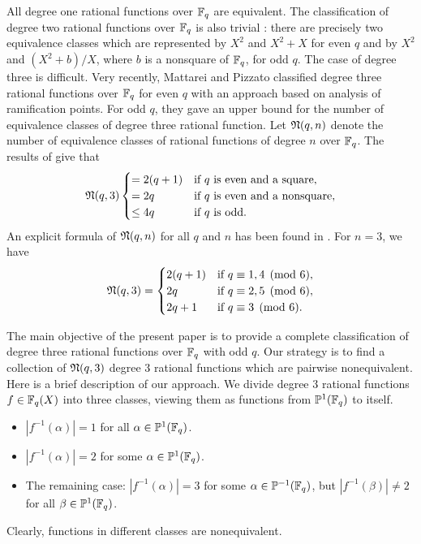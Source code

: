 \documentclass{amsart}
\numberwithin{equation}{section}
\theoremstyle{definition}
\newcommand{\f}{\Bbb F}
\begin{document}
All degree one rational functions over $\f_q$ are equivalent. The classification of degree two rational functions over $\f_q$ is also trivial \cite{Hou-AA-2025}: there are precisely two equivalence classes which are represented by $X^2$ and $X^2+X$ for even $q$ and by $X^2$ and $(X^2+b)/X$, where $b$ is a nonsquare of $\f_q$, for odd $q$. The case of degree three is difficult. Very recently, Mattarei and Pizzato \cite{Mattarei-Pizzato-JAA-2024} classified degree three rational functions over $\f_q$ for even $q$ with an approach based on analysis of ramification points. For odd $q$, they gave an upper bound for the number of equivalence classes of degree three rational function. Let $\frak N(q,n)$ denote the number of equivalence classes of rational functions of degree $n$ over $\f_q$. The results of \cite{Mattarei-Pizzato-JAA-2024} give that  
\[
\frak N(q,3)
\begin{cases}
=2(q+1)&\text{if $q$ is even and a square},\cr
=2q&\text{if $q$ is even and a nonsquare},\cr
\le 4q&\text{if $q$ is odd}.
\end{cases}
\]
An explicit formula of $\frak N(q,n)$ for all $q$ and $n$ has been found in \cite{Hou-AA-2025}. For $n=3$, we have
\begin{equation}\label{N3}
\frak N(q,3)=
\begin{cases}
2(q+1)&\text{if}\ q\equiv 1,4\pmod 6,\cr
2q&\text{if}\ q\equiv 2,5\pmod 6,\cr
2q+1&\text{if}\ q\equiv 3\pmod 6.
\end{cases}
\end{equation}

The main objective of the present paper is to provide a complete classification of degree three rational functions over $\f_q$ with odd $q$. Our strategy is to find a collection of $\frak N(q,3)$ degree 3 rational functions  which are pairwise nonequivalent. Here is a brief description of our approach. We divide degree 3 rational functions $f\in\f_q(X)$ into three classes, viewing them as functions from $\Bbb P^1(\f_q)$ to itself.
\begin{itemize}
\item[(I)] $|f^{-1}(\alpha)|=1$ for all $\alpha\in\Bbb P^1(\f_q)$.

\medskip
\item[(II)] $|f^{-1}(\alpha)|=2$ for some $\alpha\in\Bbb P^1(\f_q)$.

\medskip
\item[(III)] The remaining case: $|f^{-1}(\alpha)|=3$ for some $\alpha\in\Bbb P^{-1}(\f_q)$, but $|f^{-1}(\beta)|\ne 2$ for all $\beta\in\Bbb P^1(\f_q)$.
\end{itemize}
Clearly, functions in different classes are nonequivalent.
\end{document}
